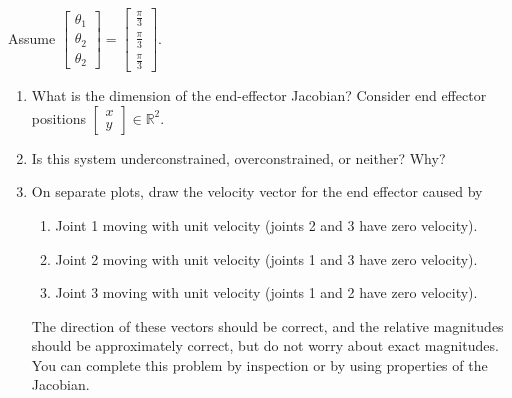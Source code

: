 \documentclass{16384_doc} %
\begin{document}
\begin{questions}
    Assume $\begin{bmatrix}
        \theta_1 \\ \theta_2 \\ \theta_2
    \end{bmatrix} = \begin{bmatrix}
        \frac\pi3 \\ \frac\pi3 \\ \frac\pi3
    \end{bmatrix}$.
    
     \begin{enumerate} [label=\alph*.]
        \item \text{[1 point]} What is the dimension of the end-effector Jacobian? Consider
        end effector positions $\begin{bmatrix}
            x \\ y
        \end{bmatrix} \in \mathbb{R}^2$. %
        \begin{tcolorbox}[height=3cm]
        \end{tcolorbox}
        
        \item \text{[1 point]} Is this system underconstrained, overconstrained, or neither?
        Why?
        \begin{tcolorbox}[height=3cm]
        \end{tcolorbox}
        
        \item \text{[6 points]} On separate plots, draw the velocity vector for the end effector
        caused by
        \begin{enumerate} [label=(\roman*)]
          \item Joint 1 moving with unit velocity (joints 2 and 3 have zero velocity).
          \item Joint 2 moving with unit velocity (joints 1 and 3 have zero velocity).
          \item Joint 3 moving with unit velocity (joints 1 and 2 have zero velocity).
        \end{enumerate}
        The direction of these vectors should be correct, and the relative
        magnitudes should be approximately correct, but do not worry about
        exact magnitudes.  You can complete this problem by inspection or by
        using properties of the Jacobian.
        \begin{tcolorbox}[height=3cm]
        \end{tcolorbox}
        

\end{enumerate}
\end{questions}
\end{document}
